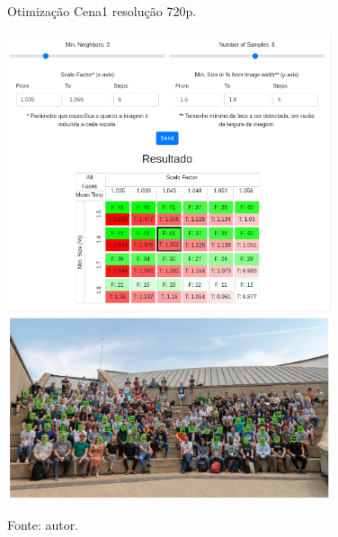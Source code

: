 \begin{figure}[H]
    \centering
    \caption[Otimização Cena1 resolução 720p.]{Otimização Cena1 resolução 720p.}
    \includegraphics[width=0.85\textwidth]{Cap4_Experimentos_Realizados/Figures/cena1_param_720p_matriz.jpg}
    \includegraphics[width=0.85\textwidth]{Cap4_Experimentos_Realizados/Figures/cena1_param_720p_faces.jpg}
    \caption*{Fonte: autor.}
    \label{fig:otimizacaoCena1_720p}
\end{figure}
